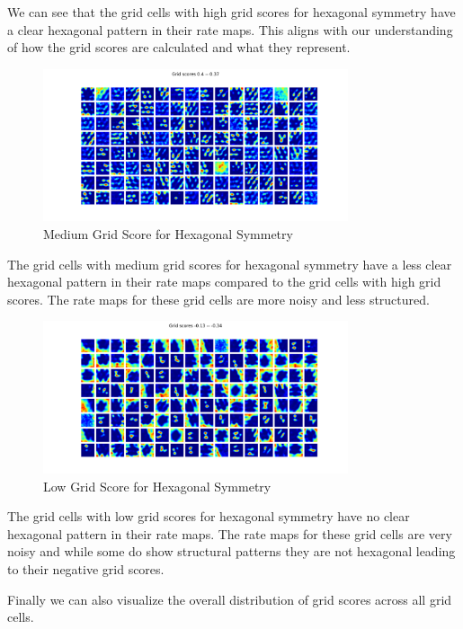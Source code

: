 \documentclass[12pt, letterpaper]{article}
\begin{document}
We can see that the grid cells with high grid scores for hexagonal symmetry have a clear hexagonal pattern in their rate maps. This aligns with our understanding of how the grid scores are calculated and what they represent.

\begin{figure}[H]
    \centering
    \includegraphics[width=0.8\textwidth]{medium_grid_scores.png}
    \caption{Medium Grid Score for Hexagonal Symmetry}
    \label{fig:medium_grid_scores}
\end{figure}

The grid cells with medium grid scores for hexagonal symmetry have a less clear hexagonal pattern in their rate maps compared to the grid cells with high grid scores. The rate maps for these grid cells are more noisy and less structured.

\begin{figure}[H]
    \centering
    \includegraphics[width=0.8\textwidth]{low_grid_scores.png}
    \caption{Low Grid Score for Hexagonal Symmetry}
    \label{fig:low_grid_scores}
\end{figure}

The grid cells with low grid scores for hexagonal symmetry have no clear hexagonal pattern in their rate maps. The rate maps for these grid cells are very noisy and while some do show structural patterns they are not hexagonal leading to their negative grid scores.

Finally we can also visualize the overall distribution of grid scores across all grid cells.
\end{document}
